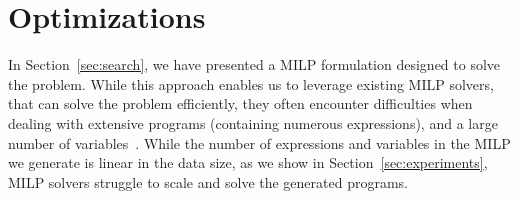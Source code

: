 


\section{Optimizations}
\label{sec:optimizations}
In Section~\ref{sec:search}, we have presented a MILP formulation designed to solve the \problem{} problem. While this approach enables us to leverage existing MILP solvers, that can solve the problem efficiently, they often encounter difficulties when dealing with extensive programs (containing numerous expressions), and a large number of variables~\cite{QFix}. While the number of expressions and variables in the MILP we generate is linear in the data size, as we show in Section~\ref{sec:experiments}, MILP solvers struggle to scale and solve the generated programs.


